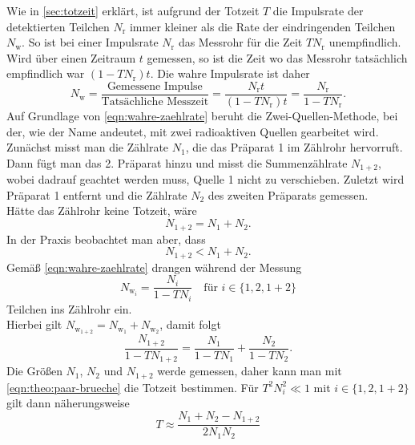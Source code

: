 Wie in \autoref{sec:totzeit} erklärt, ist aufgrund der Totzeit $T$ die Impulsrate der detektierten Teilchen $N_\text{r}$
immer kleiner als die Rate der eindringenden Teilchen $N_\text{w}$. So ist bei einer Impulsrate $N_\text{r}$ das 
Messrohr für die Zeit $TN_\text{r}$ unempfindlich. Wird über einen Zeitraum $t$ gemessen, so ist die Zeit wo
das Messrohr tatsächlich empfindlich war $(1-TN_\text{r})t$. Die wahre Impulsrate ist daher
\begin{equation}
	N_\text{w} = \frac{\text{Gemessene Impulse}}{\text{Tatsächliche Messzeit}}
	= \frac{N_\text{r} t}{(1-TN_\text{r}) t} = \frac{N_\text{r}}{1 - TN_\text{r}}.
	\label{eqn:wahre-zaehlrate}
\end{equation}
\noindent
Auf Grundlage von \autoref{eqn:wahre-zaehlrate} beruht die Zwei-Quellen-Methode, bei der, wie der Name andeutet, mit
zwei radioaktiven Quellen gearbeitet wird.
Zunächst misst man die Zählrate $N_1$, die das Präparat 1 im Zählrohr hervorruft. Dann fügt man das 2. Präparat hinzu
und misst die Summenzählrate $N_{1+2}$, wobei dadrauf geachtet werden muss, Quelle 1 nicht zu verschieben. Zuletzt
wird Präparat 1 entfernt und die Zählrate $N_2$ des zweiten Präparats gemessen.
\\
Hätte das Zählrohr keine Totzeit, wäre
\begin{equation}
	N_{1+2} = N_1 + N_2.
\end{equation}
In der Praxis beobachtet man aber, dass
\begin{equation}
	N_{1+2} < N_1 + N_2.
\end{equation}
Gemäß \autoref{eqn:wahre-zaehlrate} drangen während der Messung
\begin{equation}
	N_{{\text{w}_i}} = \frac{N_i}{1 - TN_i} 
		\quad \text{für } i \in \{1, 2, 1+2\}
\end{equation}
Teilchen ins Zählrohr ein.
\\
Hierbei gilt $N_{\text{w}_{1+2}} = N_{\text{w}_{1}} + N_{\text{w}_{2}}$, damit folgt
\begin{equation}
	\frac{N_{1+2}}{1 - TN_{1+2}} =
	\frac{N_1}{1 - TN_1} +
	\frac{N_2}{1 - TN_2} .
	\label{eqn:theo:paar-brueche}
\end{equation}
\noindent
Die Größen $N_1$, $N_2$ und $N_{1+2}$ werde gemessen, daher kann man mit \autoref{eqn:theo:paar-brueche} die 
Totzeit bestimmen. Für $T^2N_i^2 \ll 1$ mit $i \in \{1, 2, 1+2\}$ gilt dann näherungsweise
\begin{equation}
	T \approx \frac{N_1 + N_2 - N_{1+2}}{2N_1N_2}
	\label{eqn:totzeit-naeherung}
\end{equation}
